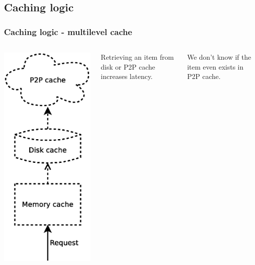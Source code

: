 \documentclass{beamer}
\begin{document}
\subsection{Caching logic}
\begin{frame}
\frametitle{Caching logic \cite{motwani1995randomized} - multilevel cache}
\begin{columns}[c]

\begin{center}
\includegraphics[width=0.65\linewidth]{cache1.eps}
\end{center}

\begin{block}{}
Retrieving an item from disk or P2P cache increases latency.
\end{block}
\begin{block}{}
We don't know if the item even exists in P2P cache.
\end{block}

\end{columns}
\end{frame}
\end{document}
